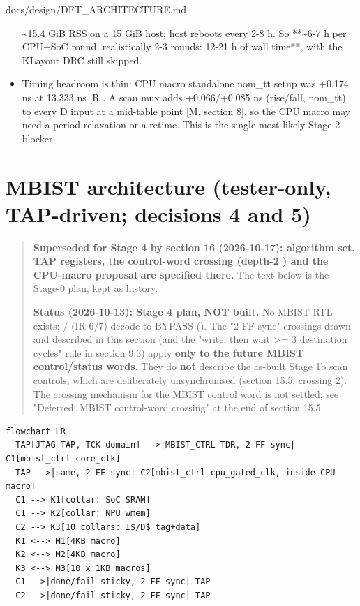 \begin{relocated}{docs/design/DFT_ARCHITECTURE.md}
\begin{itemize}
  \textasciitilde15.4 GiB RSS on a 15 GiB host; host reboots every 2-8
  h. So **\textasciitilde6-7 h per CPU+SoC round, realistically 2-3
  rounds: 12-21 h of wall time**, with the KLayout DRC still skipped.
\item
  Timing headroom is thin: CPU macro standalone nom\_tt setup was +0.174
  ns at 13.333 ns {[}R
  \src{memory/pd/run_state.archived_pd_20260918_repo_root.md}{]}. A scan
  mux adds +0.066/\allowbreak{}+0.085 ns (rise/\allowbreak{}fall,
  nom\_tt) to every  D input at a mid-table point {[}M,
  section 8{]}, so the CPU macro may need a period relaxation or a
  retime. This is the single most likely Stage 2 blocker.
\end{itemize}

\section{MBIST architecture (tester-only, TAP-driven; decisions 4 and
5)}\label{tm:ch:dft-architecture:6-mbist-architecture-tester-only-tap-driven-decisions-4-and-5}

\begin{quote}
\textbf{Superseded for Stage 4 by section 16 (2026-10-17): algorithm
set, TAP registers, the control-word crossing (depth-2
) and the CPU-macro proposal are specified there.}
The text below is the Stage-0 plan, kept as history.

\textbf{Status (2026-10-13): Stage 4 plan, NOT built.} No MBIST RTL
exists; / (IR 6/7) decode to BYPASS
(). The "2-FF sync" crossings drawn and described
in this section (and the "write, then wait \textgreater= 3 destination
cycles" rule in section 9.3) apply \textbf{only to the future MBIST
control/\allowbreak{}status words}. They do \textbf{not} describe the
as-built Stage 1b scan controls, which are deliberately unsynchronised
(section 15.5, crossing 2). The crossing mechanism for the MBIST control
word is not settled; see "Deferred: MBIST control-word crossing" at the
end of section 15.5.
\end{quote}

\begin{lstlisting}[language={},caption={Diagram source (Mermaid)}]
flowchart LR
  TAP[JTAG TAP, TCK domain] -->|MBIST_CTRL TDR, 2-FF sync| C1[mbist_ctrl core_clk]
  TAP -->|same, 2-FF sync| C2[mbist_ctrl cpu_gated_clk, inside CPU macro]
  C1 --> K1[collar: SoC SRAM]
  C1 --> K2[collar: NPU wmem]
  C2 --> K3[10 collars: I$/D$ tag+data]
  K1 <--> M1[4KB macro]
  K2 <--> M2[4KB macro]
  K3 <--> M3[10 x 1KB macros]
  C1 -->|done/fail sticky, 2-FF sync| TAP
  C2 -->|done/fail sticky, 2-FF sync| TAP
\end{lstlisting}


\end{relocated}
